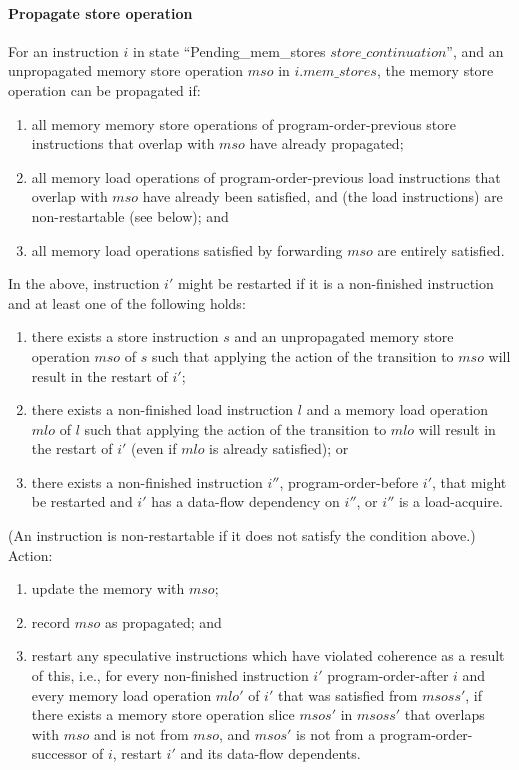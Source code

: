 \paragraph{Propagate store operation}\label{omm:prop_store}
For an instruction $i$ in state ``{\sc Pending\_mem\_stores} $store\_continuation$'', and an unpropagated memory store operation $mso$ in $i.mem\_stores$, the memory store operation can be propagated if:
\begin{enumerate}
\item all memory memory store operations of program-order-previous store instructions that overlap with $mso$ have already propagated;
\item all memory load operations of program-order-previous load instructions that overlap with $mso$ have already been satisfied, and (the load instructions) are non-restartable (see below); and
\item all memory load operations satisfied by forwarding $mso$ are entirely satisfied.
\end{enumerate}
In the above, instruction $i'$ might be restarted if it is a non-finished instruction and at least one of the following holds:
\begin{enumerate}
\item there exists a store instruction $s$ and an unpropagated memory store operation $mso$ of $s$ such that applying the action of the  transition to $mso$ will result in the restart of $i'$;
\item there exists a non-finished load instruction $l$ and a memory load operation $mlo$ of $l$ such that applying the action of the  transition to $mlo$ will result in the restart of $i'$ (even if $mlo$ is already satisfied); or
\item there exists a non-finished instruction $i''$, program-order-before $i'$, that might be restarted and $i'$ has a data-flow dependency on $i''$, or $i''$ is a load-acquire.
\end{enumerate}
(An instruction is non-restartable if it does not satisfy the condition above.)
Action:
\begin{enumerate}
\item update the memory with $mso$;
\item record $mso$ as propagated; and
\item restart any speculative instructions which have violated coherence as a result of this, i.e., for every non-finished instruction $i'$ program-order-after $i$ and every memory load operation $mlo'$ of $i'$ that was satisfied from $msoss'$, if there exists a memory store operation slice $msos'$ in $msoss'$ that overlaps with $mso$ and is not from $mso$, and $msos'$ is not from a program-order-successor of $i$, restart $i'$ and its data-flow dependents.
\end{enumerate}


